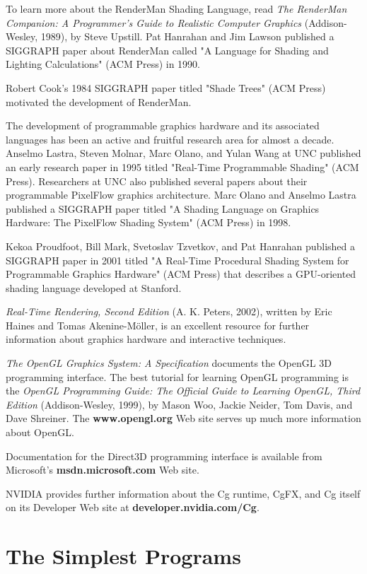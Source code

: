 \documentclass{book}
\begin{document}
To learn more about the RenderMan Shading Language, read \textit{The RenderMan Companion: A Programmer's Guide to Realistic Computer Graphics} (Addison-Wesley, 1989), by Steve Upstill. Pat Hanrahan and Jim Lawson published a SIGGRAPH paper about RenderMan called "A Language for Shading and Lighting Calculations" (ACM Press) in 1990.

Robert Cook's 1984 SIGGRAPH paper titled "Shade Trees" (ACM Press) motivated the development of RenderMan.

The development of programmable graphics hardware and its associated languages has been an active and fruitful research area for almost a decade. Anselmo Lastra, Steven Molnar, Marc Olano, and Yulan Wang at UNC published an early research paper in 1995 titled "Real-Time Programmable Shading" (ACM Press). Researchers at UNC also published several papers about their programmable PixelFlow graphics architecture. Marc Olano and Anselmo Lastra published a SIGGRAPH paper titled "A Shading Language on Graphics Hardware: The PixelFlow Shading System" (ACM Press) in 1998.

Kekoa Proudfoot, Bill Mark, Svetoslav Tzvetkov, and Pat Hanrahan published a SIGGRAPH paper in 2001 titled "A Real-Time Procedural Shading System for Programmable Graphics Hardware" (ACM Press) that describes a GPU-oriented shading language developed at Stanford.

\textit{Real-Time Rendering, Second Edition} (A. K. Peters, 2002), written by Eric Haines and Tomas Akenine-Möller, is an excellent resource for further information about graphics hardware and interactive techniques.

\textit{The OpenGL Graphics System: A Specification} documents the OpenGL 3D programming interface. The best tutorial for learning OpenGL programming is the \textit{OpenGL Programming Guide: The Official Guide to Learning OpenGL, Third Edition} (Addison-Wesley, 1999), by Mason Woo, Jackie Neider, Tom Davis, and Dave Shreiner. The \textbf{www.opengl.org} Web site serves up much more information about OpenGL.

Documentation for the Direct3D programming interface is available from Microsoft's \textbf{msdn.microsoft.com} Web site.

NVIDIA provides further information about the Cg runtime, CgFX, and Cg itself on its Developer Web site at \textbf{developer.nvidia.com/Cg}.

\chapter{The Simplest Programs}
\end{document}
